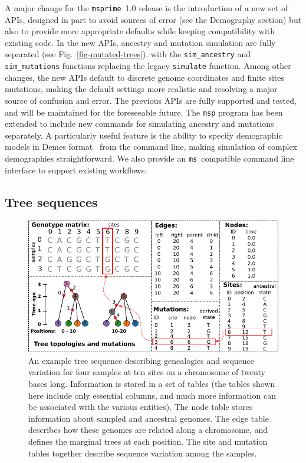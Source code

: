 \documentclass{article}
\newcommand{\msprime}[0]{\texttt{msprime}}
\newcommand{\ms}[0]{\texttt{ms}}
\begin{document}
A major change for the \msprime\ 1.0 release is the introduction of a new set of APIs,
designed in part to avoid sources of error (see the Demography section) but
also to provide more appropriate defaults while keeping compatibility with
existing code. In the new APIs, ancestry and mutation simulation are fully
separated (see Fig.~\ref{fig-mutated-trees}),
with the \texttt{sim\_ancestry} and \texttt{sim\_mutations}
functions replacing the legacy \texttt{simulate} function. Among other changes,
the new APIs default to discrete genome coordinates and finite sites mutations,
making the default settings more realistic and resolving a major source of confusion and error.
The previous APIs are fully
supported and tested, and will be maintained for the foreseeable future.
The \texttt{msp} program has been extended to include new commands
for simulating ancestry and mutations separately. A particularly useful
feature is the ability to specify demographic models in
Demes format~\citep{gower2021demes} from the command line,
making simulation of complex demographies straightforward.
We also provide an \ms\ compatible
command line interface to support existing workflows.

\subsection*{Tree sequences}
\label{sec-ts}

\begin{figure}
\begin{center}
\includegraphics{illustrations/example_tree_sequence}
\end{center}
\caption{\label{fig-ts-example} An example tree sequence describing
genealogies and sequence variation for four samples at ten sites
on a chromosome of twenty bases long.
Information is stored in a set of tables
(the tables shown here include only essential columns, and
much more information can be associated with the various entities).
The node table
stores information about sampled and ancestral genomes. The
edge table describes how these genomes are related along a
chromosome, and defines the marginal trees at each position.
The site and mutation tables together describe sequence variation
among the samples.
}
\end{figure}
\end{document}
